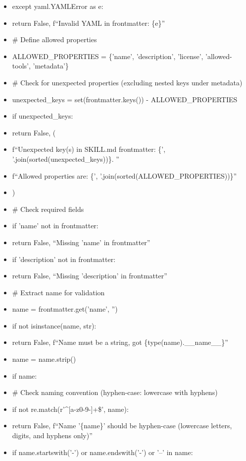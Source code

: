 \documentclass[11pt]{article}
\begin{document}
\begin{itemize}[leftmargin=*,itemsep=2pt,topsep=2pt]
\item {} except yaml.YAMLError as e:
\item {} return False, f``Invalid YAML in frontmatter: \{e\}''
\item {} \# Define allowed properties
\item {} ALLOWED\_\allowbreak{}PROPERTIES = \{'name', 'description', 'license', 'allowed-tools', 'metadata'\}
\item {} \# Check for unexpected properties (excluding nested keys under metadata)
\item {} unexpected\_\allowbreak{}keys = set(frontmatter.keys()) - ALLOWED\_\allowbreak{}PROPERTIES
\item {} if unexpected\_\allowbreak{}keys:
\item {} return False, (
\item {} f``Unexpected key(s) in SKILL.md frontmatter: \{', '.join(sorted(unexpected\_\allowbreak{}keys))\}. ''
\item {} f``Allowed properties are: \{', '.join(sorted(ALLOWED\_\allowbreak{}PROPERTIES))\}''
\item {} )
\item {} \# Check required fields
\item {} if 'name' not in frontmatter:
\item {} return False, ``Missing 'name' in frontmatter''
\item {} if 'description' not in frontmatter:
\item {} return False, ``Missing 'description' in frontmatter''
\item {} \# Extract name for validation
\item {} name = frontmatter.get('name', '')
\item {} if not isinstance(name, str):
\item {} return False, f``Name must be a string, got \{type(name).\_\allowbreak{}\_\allowbreak{}name\_\allowbreak{}\_\allowbreak{}\}''
\item {} name = name.strip()
\item {} if name:
\item {} \# Check naming convention (hyphen-case: lowercase with hyphens)
\item {} if not re.match(r'\textasciicircum{}[a-z0-9-]+\$', name):
\item {} return False, f``Name '\{name\}' should be hyphen-case (lowercase letters, digits, and hyphens only)''
\item {} if name.startswith('-') or name.endswith('-') or '--' in name:

\end{itemize}
\end{document}
